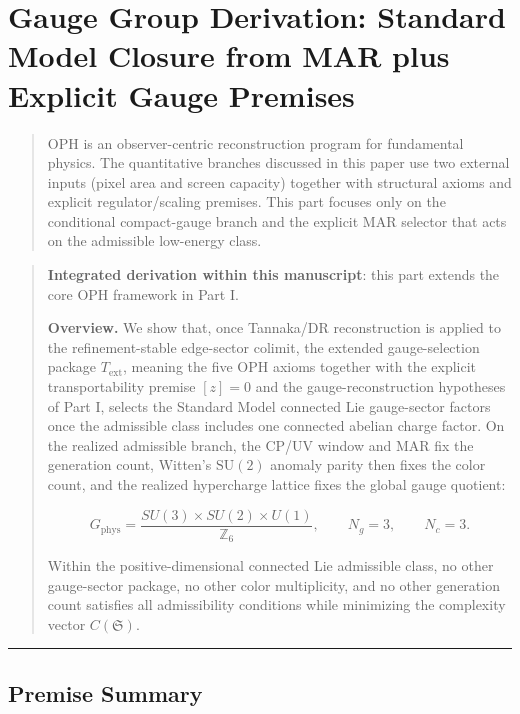 \section{Gauge Group Derivation: Standard Model Closure from MAR plus Explicit Gauge Premises}\label{gauge-group-derivation-standard-model-closure-under-extended-mar}

\begin{quote}
OPH is an observer-centric reconstruction program for fundamental physics. The quantitative branches discussed in this paper use two external inputs (pixel area and screen capacity) together with structural axioms and explicit regulator/scaling premises. This part focuses only on the conditional compact-gauge branch and the explicit MAR selector that acts on the admissible low-energy class.
\end{quote}

\begin{quote}
\textbf{Integrated derivation within this manuscript}: this part extends the core OPH framework in Part I.

\textbf{Overview.} We show that, once Tannaka/DR reconstruction is applied to the refinement-stable edge-sector colimit, the extended gauge-selection package \(T_{\mathrm{ext}}\), meaning the five OPH axioms together with the explicit transportability premise \([z]=0\) and the gauge-reconstruction hypotheses of Part I, selects the Standard Model connected Lie gauge-sector factors once the admissible class includes one connected abelian charge factor. On the realized admissible branch, the CP/UV window and MAR fix the generation count, Witten's \(\mathrm{SU}(2)\) anomaly parity then fixes the color count, and the realized hypercharge lattice fixes the global gauge quotient:

\[G_{\mathrm{phys}} = \frac{SU(3) \times SU(2) \times U(1)}{\mathbb{Z}_6}, \qquad N_g = 3, \qquad N_c = 3.\]

Within the positive-dimensional connected Lie admissible class, no other gauge-sector package, no other color multiplicity, and no other generation count satisfies all admissibility conditions while minimizing the complexity vector \(C(\mathfrak S)\).
\end{quote}

\begin{center}\rule{0.5\linewidth}{0.5pt}\end{center}

\subsection{Premise Summary}\label{1-premise-summary}

